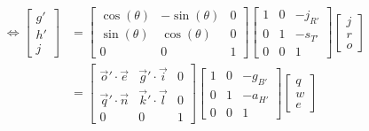 \documentclass{gif7001}
\begin{document}
\begin{enumerate}
\begin{align*}
        \Leftrightarrow \begin{bmatrix}g'\\h'\\j\end{bmatrix} &= \begin{bmatrix}\cos(\theta)&-\sin(\theta)&0\\\sin(\theta)&\cos(\theta)&0\\0&0&1\end{bmatrix} \begin{bmatrix}1&0&-j_{R'}\\0&1&-s_{T'}\\0&0&1\end{bmatrix} \begin{bmatrix}j\\r\\o\end{bmatrix} \\
        &= \begin{bmatrix}\vec{o}'\cdot\vec{e}&\vec{g}'\cdot\vec{i}&0\\\vec{q}'\cdot\vec{n}&\vec{k}'\cdot\vec{l}&0\\0&0&1\end{bmatrix} \begin{bmatrix}1&0&-g_{B'}\\0&1&-a_{H'}\\0&0&1\end{bmatrix} \begin{bmatrix}q\\w\\e\end{bmatrix}
    \end{align*}
\end{enumerate}
\end{document}
